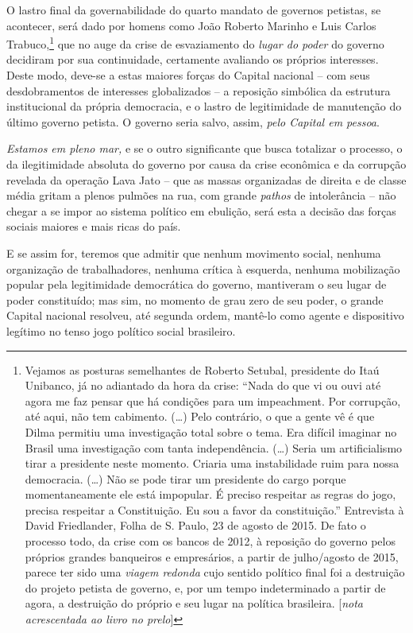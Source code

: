 O lastro final da governabilidade do quarto mandato de governos
petistas, se acontecer, será dado por homens como João Roberto Marinho e
Luis Carlos Trabuco,\footnote{Vejamos as posturas semelhantes de Roberto
  Setubal, presidente do Itaú Unibanco, já no adiantado da hora da
  crise: ``Nada do que vi ou ouvi até agora me faz pensar que há
  condições para um impeachment. Por corrupção, até aqui, não tem
  cabimento. (…) Pelo contrário, o que a gente vê é que Dilma permitiu
  uma investigação total sobre o tema. Era difícil imaginar no Brasil
  uma investigação com tanta independência. (…) Seria um
  artificialismo tirar a presidente neste momento. Criaria uma
  instabilidade ruim para nossa democracia. (…) Não se pode tirar um
  presidente do cargo porque momentaneamente ele está impopular. É
  preciso respeitar as regras do jogo, precisa respeitar a Constituição.
  Eu sou a favor da constituição.'' Entrevista à David Friedlander,
  Folha de S. Paulo, 23 de agosto de 2015. De fato o processo todo, da
  crise com os bancos de 2012, à reposição do governo pelos próprios
  grandes banqueiros e empresários, a partir de julho/agosto de 2015,
  parece ter sido uma \emph{viagem redonda} cujo sentido político final
  foi a destruição do projeto petista de governo, e, por um tempo
  indeterminado a partir de agora, a destruição do próprio  e seu
  lugar na política brasileira. {[}\emph{nota acrescentada ao livro no
  prelo}{]}} que no auge da crise de esvaziamento do \emph{lugar do
poder} do governo decidiram por sua continuidade, certamente avaliando
os próprios interesses. Deste modo, deve-se a estas maiores forças do
Capital nacional -- com seus desdobramentos de interesses globalizados
-- a reposição simbólica da estrutura institucional da própria
democracia, e o lastro de legitimidade de manutenção do último governo
petista. O governo seria salvo, assim, \emph{pelo Capital em pessoa}.

\emph{Estamos em pleno mar,} e se o outro significante que busca
totalizar o processo, o da ilegitimidade absoluta do governo por causa
da crise econômica e da corrupção revelada da operação Lava Jato -- que
as massas organizadas de direita e de classe média gritam a plenos
pulmões na rua, com grande \emph{pathos} de intolerância -- não chegar a
se impor ao sistema político em ebulição, será esta a decisão das forças
sociais maiores e mais ricas do país.

E se assim for, teremos que admitir que nenhum movimento social, nenhuma
organização de trabalhadores, nenhuma crítica à esquerda, nenhuma
mobilização popular pela legitimidade democrática do governo, mantiveram
o seu lugar de poder constituído; mas sim, no momento de grau zero de
seu poder, o grande Capital nacional resolveu, até segunda ordem,
mantê-lo como agente e dispositivo legítimo no tenso jogo político
social brasileiro.

